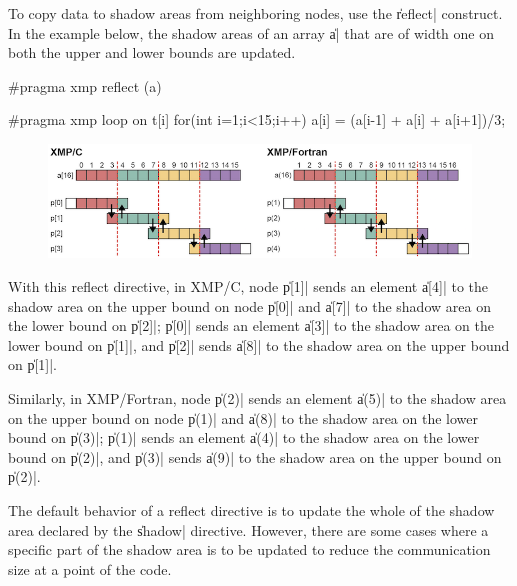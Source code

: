To copy data to shadow areas from neighboring nodes, use the \|reflect|
construct. In the example below, the shadow areas of an array \|a| that
are of width one on both the upper and lower bounds are updated.

\begin{XCexample}
#pragma xmp reflect (a)

#pragma xmp loop on t[i]
for(int i=1;i<15;i++)
  a[i] = (a[i-1] + a[i] + a[i+1])/3;
\end{XCexample}


\begin{figure}
  \centering
  \includegraphics[width=\textwidth]{figs/reflect.png}
\end{figure}

With this reflect directive, in XMP/C, node \|p[1]| sends an element
\|a[4]| to the shadow area on the upper bound on node \|p[0]| and
\|a[7]| to the shadow area on the lower bound on \|p[2]|; \|p[0]| sends
an element \|a[3]| to the shadow area on the lower bound on \|p[1]|, and
\|p[2]| sends \|a[8]| to the shadow area on the upper bound on \|p[1]|.

Similarly, in XMP/Fortran, node \|p(2)| sends an element \|a(5)| to the
shadow area on the upper bound on node \|p(1)| and \|a(8)| to the shadow
area on the lower bound on \|p(3)|; \|p(1)| sends an element \|a(4)| to
the shadow area on the lower bound on \|p(2)|, and \|p(3)| sends \|a(9)|
to the shadow area on the upper bound on \|p(2)|.


The default behavior of a reflect directive is to update the whole of
the shadow area declared by the \|shadow| directive. However, there are
some cases where a specific part of the shadow area is to be updated to
reduce the communication size at a point of the code.


